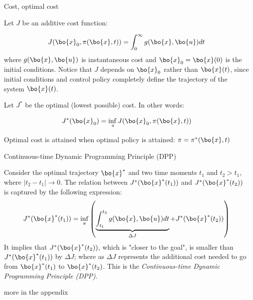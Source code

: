 \documentclass{beamer}
\begin{document}
\begin{frame}{Cost, optimal cost}
\begin{flushleft}

Let $J$ be an additive cost function:

\begin{equation}
J (\bo{x}_0, \pi (\bo{x}, t)) = \int_0^\infty g(\bo{x}, \bo{u}) dt
\end{equation}
%
where $g(\bo{x}, \bo{u})$ is instantaneous cost and $\bo{x}_0 = \bo{x}(0)$ is the initial conditions. Notice that $J$ depends on $\bo{x}_0$ rather than $\bo{x}(t)$, since initial conditions and control policy completely define the trajectory of the system $\bo{x}(t)$.


\bigskip

Let $J^*$ be the optimal (lowest possible) cost. In other words:

\begin{equation}
J^*(\bo{x}_0) = \underset{\pi}{\inf{}} J(\bo{x}_0, \pi (\bo{x}, t))
\end{equation}

Optimal cost is attained when optimal policy is attained: $\pi = \pi^*(\bo{x}, t)$

\end{flushleft}
\end{frame}



\begin{frame}{Continuous-time Dynamic Programming Principle (DPP)}
	\begin{flushleft}
		
		Consider the optimal trajectory $\bo{x}^*$ and two time moments $t_1$ and $t_2 > t_1$, where $|t_2 - t_1| \rightarrow 0$. The relation between $J^*(\bo{x}^*(t_1))$ and $J^*(\bo{x}^*(t_2))$ is captured by the following expression:
		\begin{equation}
			J^*(\bo{x}^*(t_1)) = \inf_\pi \left(  \underbrace{\int_{t_1}^{t_2} g(\bo{x}, \bo{u}) dt }_{\Delta J} +  J^*(\bo{x}^*(t_2))  \right)
		\end{equation}
		It implies that $J^*(\bo{x}^*(t_2))$, which is "closer to the goal", is smaller than $J^*(\bo{x}^*(t_1))$ by $\Delta J$; where as $\Delta J$ represents the additional cost needed to go from $\bo{x}^*(t_1)$ to $\bo{x}^*(t_2)$. This is the \emph{Continuous-time Dynamic Programming Principle (DPP)}.
		
		\bigskip
		
		\textcolor{mygray}{more in the appendix}
		
	\end{flushleft}
\end{frame}
\end{document}
